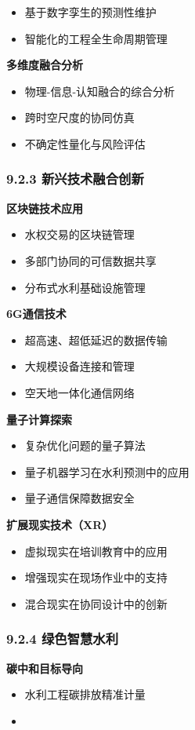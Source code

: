 \begin{itemize}
从规划设计到运行维护的全过程数字化 \item 基于数字孪生的预测性维护 \item 智能化的工程全生命周期管理 \end{itemize} \textbf{多维度融合分析} \begin{itemize} \tightlist \item
物理-信息-认知融合的综合分析 \item 跨时空尺度的协同仿真 \item 不确定性量化与风险评估 \end{itemize} \subsubsection{9.2.3
新兴技术融合创新}\label{ux65b0ux5174ux6280ux672fux878dux5408ux521bux65b0} \textbf{区块链技术应用} \begin{itemize} \tightlist \item
水权交易的区块链管理 \item 多部门协同的可信数据共享 \item 分布式水利基础设施管理 \end{itemize} \textbf{6G通信技术} \begin{itemize} \tightlist \item
超高速、超低延迟的数据传输 \item 大规模设备连接和管理 \item 空天地一体化通信网络 \end{itemize} \textbf{量子计算探索} \begin{itemize} \tightlist \item
复杂优化问题的量子算法 \item 量子机器学习在水利预测中的应用 \item 量子通信保障数据安全 \end{itemize} \textbf{扩展现实技术（XR）} \begin{itemize} \tightlist \item
虚拟现实在培训教育中的应用 \item 增强现实在现场作业中的支持 \item 混合现实在协同设计中的创新 \end{itemize} \subsubsection{9.2.4
绿色智慧水利}\label{ux7effux8272ux667aux6167ux6c34ux5229} \textbf{碳中和目标导向} \begin{itemize} \tightlist \item 水利工程碳排放精准计量 \item

\end{itemize}
